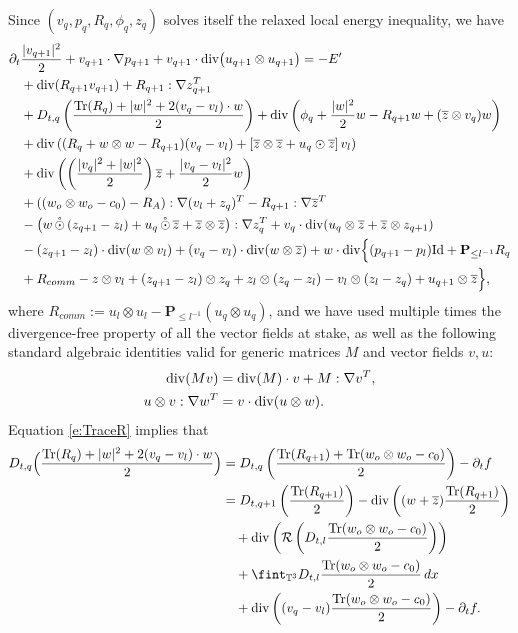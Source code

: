 \documentclass[10pt,a4paper]{amsart}
\numberwithin{equation}{section}
\numberwithin{corollario}{section}
\numberwithin{lemma}{section}
\numberwithin{prop}{section}
\theoremstyle{definition}
\theoremstyle{remark}
\newcommand{\T}{\mathbb{T}}
\renewcommand{\P}{\mathbf{P}}
\newcommand{\dvg}{\mathord{{\rm div}}}
\newcommand{\Id}{\mathrm{Id}}
\newcommand{\varz}{\overline{z}}
\newcommand{\AntiDiv}{\mathcal{R}}
\newcommand{\proj}{\mathbf{P}}
\DeclareMathOperator{\Tr}{Tr}
\newcommand{\qq}{_{q+1}}
\newcommand{\SymOt}{\odot}
\newcommand{\SymOtNoTr}{\,\mathring{\odot}\,}
\begin{document}
Since $(v_q,p_q, R_q,\phi_q,z_q)$ solves itself the relaxed local energy inequality, we have
    \begin{align}\label{e:NewCurrent1}
        \partial_t&\frac{|v\qq|^2}{2}
        +
        v\qq\cdot \nabla p\qq
        +
        v\qq \cdot\dvg\big(u\qq\otimes u\qq\big) 
        =
        -E'
        \\
        &+\dvg(R\qq v\qq)+R\qq:\nabla z\qq^T
        \\
        &+D_{t,q}\left(\frac{\Tr(R_q)+|w|^2+2(v_q-v_l)\cdot w}{2}\right)+\dvg\left(\phi_q+\frac{|w|^2}{2}w-R\qq w+(\varz\otimes v_q)w\right)
        \\
        &+\dvg\left((R_q+w \otimes w -R\qq)(v_q-v_l)+\left[\varz \otimes \varz+u_q\SymOt \varz\right]v_l
    \right)\\
    &+\dvg\left(\left(\frac{|v_q|^2+|w|^2}{2}\right)\varz+\frac{|v_q-v_l|^2}{2}w\right)
        \\
        &+\left((w_o \otimes w_o-c_0)-R_A\right):\nabla(v_l+z_q)^T-R\qq:\nabla\varz^T
        \\
        &-\left(w\SymOtNoTr(z\qq-z_l)+u_q\SymOtNoTr \varz+\varz \otimes \varz\right):\nabla z_q^T+v_q\cdot\dvg(u_q\otimes \varz+\varz\otimes z\qq)
        \\
        &-(z\qq-z_l)\cdot \dvg(w\otimes v_l)+(v_q-v_l)\cdot\dvg(w\otimes \varz )+w\cdot\dvg\Big\{(p\qq-p_l)\Id+\P_{\leq l^{-1}}R_q
        \\
        &+R_{comm}-z\otimes v_l+(z\qq-z_l)\otimes z_q+ z_l\otimes (z_q-z_l)-v_l\otimes(z_l-z_q)+u\qq\otimes \varz\Big\},
    \end{align} 
       where $R_{comm}:=u_l\otimes u_l-\proj_{\le l^{-1}}(u_q\otimes u_q)$, and we have used multiple times the divergence-free property of all the vector fields at stake, as well as the following standard algebraic identities valid for generic matrices $M$ and vector fields $v,u$:
\begin{align}
  \dvg(Mv)&=\dvg(M)\cdot v+M:\nabla v^T, 
  \\
  u\otimes v:\nabla w^T&=v\cdot \dvg(u\otimes w).
\end{align}
Equation \eqref{e:TraceR} implies that
\begin{align}
    D_{t,q}\Big(\frac{\Tr(R_q)+|w|^2+2(v_q-v_l)\cdot w}{2}\Big)&=D_{t,q}\left(\frac{\Tr(R\qq)+\Tr(w_o \otimes w_o-c_0)}{2}\right)-\partial_t f\\
    &=D_{t,q+1}\left(\frac{\Tr(R\qq)}{2}\right)-\dvg\left((w+\varz)\frac{\Tr(R\qq)}{2}\right)\\
    &\quad+\dvg\left(\AntiDiv\left(D_{t,l}\frac{\Tr(w_o \otimes w_o-c_0)}{2}\right)\right)
    \\
    &\quad+\fint_{\T^3} D_{t,l}\frac{\Tr(w_o \otimes w_o-c_0)}{2}\,dx\\
    &\quad+\dvg\left( (v_q-v_l)\frac{\Tr(w_o \otimes w_o-c_0)}{2}\right)-\partial_t f.
\end{align}
\end{document}
